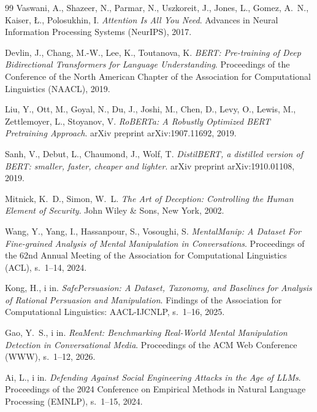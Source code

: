 \documentclass[12pt,a4paper,twoside]{report}
\begin{document}
\begin{thebibliography}{99}
  Vaswani, A., Shazeer, N., Parmar, N., Uszkoreit, J., Jones, L., Gomez, A.~N., Kaiser, {\L}., Polosukhin, I.
  \textit{Attention Is All You Need}.
  Advances in Neural Information Processing Systems (NeurIPS), 2017.

  Devlin, J., Chang, M.-W., Lee, K., Toutanova, K.
  \textit{BERT: Pre-training of Deep Bidirectional Transformers for Language Understanding}.
  Proceedings of the Conference of the North American Chapter of the Association for Computational Linguistics (NAACL), 2019.

  Liu, Y., Ott, M., Goyal, N., Du, J., Joshi, M., Chen, D., Levy, O., Lewis, M., Zettlemoyer, L., Stoyanov, V.
  \textit{RoBERTa: A Robustly Optimized BERT Pretraining Approach}.
  arXiv preprint arXiv:1907.11692, 2019.

  Sanh, V., Debut, L., Chaumond, J., Wolf, T.
  \textit{DistilBERT, a distilled version of BERT: smaller, faster, cheaper and lighter}.
  arXiv preprint arXiv:1910.01108, 2019.

  Mitnick, K.~D., Simon, W.~L.
  \textit{The Art of Deception: Controlling the Human Element of Security}.
  John Wiley \& Sons, New York, 2002.

  Wang, Y., Yang, I., Hassanpour, S., Vosoughi, S.
  \textit{MentalManip: A Dataset For Fine-grained Analysis of Mental Manipulation in Conversations}.
  Proceedings of the 62nd Annual Meeting of the Association for Computational Linguistics (ACL), s.~1--14, 2024.

  Kong, H., i in.
  \textit{SafePersuasion: A Dataset, Taxonomy, and Baselines for Analysis of Rational Persuasion and Manipulation}.
  Findings of the Association for Computational Linguistics: AACL-IJCNLP, s.~1--16, 2025.

  Gao, Y.~S., i in.
  \textit{ReaMent: Benchmarking Real-World Mental Manipulation Detection in Conversational Media}.
  Proceedings of the ACM Web Conference (WWW), s.~1--12, 2026.

  Ai, L., i in.
  \textit{Defending Against Social Engineering Attacks in the Age of LLMs}.
  Proceedings of the 2024 Conference on Empirical Methods in Natural Language Processing (EMNLP), s.~1--15, 2024.


\end{thebibliography}
\end{document}
